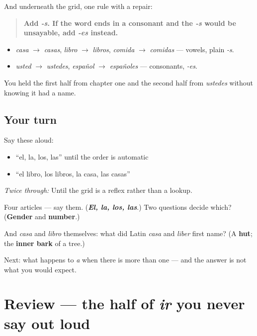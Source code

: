 \begin{grammarlens}[title={Grammar Lens: the two plural rules}]
And underneath the grid, one rule with a repair:

\begin{quote}
\textbf{Add \emph{-s}. If the word ends in a consonant and the \emph{-s} would be unsayable, add \emph{-es} instead.}
\end{quote}

\begin{itemize}
\raggedright
  \item \emph{casa} $\to$ \emph{casas}, \emph{libro} $\to$ \emph{libros}, \emph{comida} $\to$ \emph{comidas} — vowels, plain \emph{-s}.
  \item \emph{usted} $\to$ \emph{ustedes}, \emph{español} $\to$ \emph{españoles} — consonants, \emph{-es}.
\end{itemize}

You held the first half from chapter one and the second half from \emph{ustedes} without knowing it had a name.
\end{grammarlens}

\subsection*{Your turn}
Say these aloud:

\begin{itemize}
\raggedright
  \item \textquotedblleft{}el, la, los, las\textquotedblright{} until the order is automatic
  \item \textquotedblleft{}el libro, los libros, la casa, las casas\textquotedblright{}
\end{itemize}

\emph{Twice through:} Until the grid is a reflex rather than a lookup.

\begin{tcolorbox}[breakable,colback=teal!4,colframe=teal!35!black,title={Before you move on}]
Four articles — say them. (\emph{\textbf{El, la, los, las}}.) Two questions decide which? (\textbf{Gender} and \textbf{number}.)

And \emph{casa} and \emph{libro} themselves: what did Latin \emph{casa} and \emph{liber} first name? (A \textbf{hut}; the \textbf{inner bark} of a tree.)

Next: what happens to \emph{a} when there is more than one — and the answer is not what you would expect.
\end{tcolorbox}
\section[(review)]{Review — the half of \emph{ir} you never say out loud}


